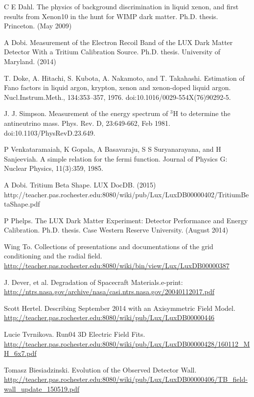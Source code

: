 \documentclass[a4paper,12pt]{article}
\begin{document}
{\begin{thebibliography}{1}
 C E Dahl.  The physics of background discrimination in liquid xenon, and first results from Xenon10 in the hunt for WIMP dark matter.  Ph.D. thesis.  Princeton.  (May 2009)

 A Dobi.  Measurement of the Electron Recoil Band of the LUX Dark Matter Detector With a Tritium Calibration Source.  Ph.D. thesis.  University of Maryland.  (2014)

 T. Doke, A. Hitachi, S. Kubota, A. Nakamoto, and T. Takahashi. Estimation of Fano factors in liquid argon, krypton, xenon and xenon-doped liquid argon. Nucl.Instrum.Meth., 134:353–357, 1976. doi:10.1016/0029-554X(76)90292-5.

 J.  J.  Simpson.   Measurement  of  the energy  spectrum  of
$^3$H  to determine the antineutrino mass. Phys. Rev. D, 23:649-662, Feb 1981. doi:10.1103/PhysRevD.23.649.

 P Venkataramaiah, K Gopala, A Basavaraju, S S Suryanarayana,
and H Sanjeeviah. A simple relation for the fermi function. Journal of Physics G: Nuclear Physics, 11(3):359, 1985.

 A Dobi.  Tritium Beta Shape. LUX DocDB. (2015) http://teacher.pas.rochester.edu:8080/wiki/pub/Lux/LuxDB00000402/TritiumBetaShape.pdf

 P Phelps.  The LUX Dark Matter Experiment: Detector Performance and Energy Calibration.  Ph.D. thesis.  Case Western Reserve University.  (August 2014)



 Wing To.  Collections of presentations and documentations of the grid conditioning and the radial field.  \url{http://teacher.pas.rochester.edu:8080/wiki/bin/view/Lux/LuxDB00000387}

 J. Dever, et al. Degradation of Spacecraft Materials.e-print:  \url{http://ntrs.nasa.gov/archive/nasa/casi.ntrs.nasa.gov/20040112017.pdf}

 Scott Hertel.  Describing September 2014 with an Axisymmetric Field Model. \url{http://teacher.pas.rochester.edu:8080/wiki/pub/Lux/LuxDB00000446}

 Lucie Tvrnikova.  Run04 3D Electric Field Fits.  \url{http://teacher.pas.rochester.edu:8080/wiki/pub/Lux/LuxDB00000428/160112_MH_6x7.pdf}

 Tomasz Biesiadzinski.  Evolution of the Observed Detector Wall. \url{http://teacher.pas.rochester.edu:8080/wiki/pub/Lux/LuxDB00000406/TB_field-wall_update_150519.pdf}


\end{thebibliography}}
\end{document}
